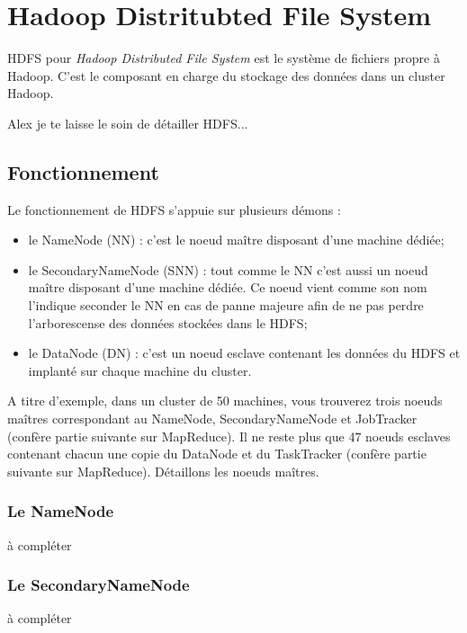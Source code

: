 \section{Hadoop Distritubted File System}

\par HDFS pour \textit{Hadoop Distributed File System} est le système de fichiers propre à Hadoop. C'est le composant en charge du stockage des données dans un cluster Hadoop.

\par Alex je te laisse le soin de détailler HDFS...

\subsection{Fonctionnement}

\par Le fonctionnement de HDFS s'appuie sur plusieurs démons :

\begin{itemize}
\item le NameNode (NN) : c'est le noeud maître disposant d'une machine dédiée;
\item le SecondaryNameNode (SNN) : tout comme le NN c'est aussi un noeud maître disposant d'une machine dédiée. Ce noeud vient comme son nom l'indique seconder le NN en cas de panne majeure afin de ne pas perdre l'arborescense des données stockées dans le HDFS;
\item le DataNode (DN) : c'est un noeud esclave contenant les données du HDFS et implanté sur chaque machine du cluster.
\end{itemize}

\par A titre d'exemple, dans un cluster de 50 machines, vous trouverez trois noeuds maîtres correspondant au NameNode, SecondaryNameNode et JobTracker (confère partie suivante sur MapReduce). Il ne reste plus que 47 noeuds esclaves contenant chacun une copie du DataNode et du TaskTracker (confère partie suivante sur MapReduce). Détaillons les noeuds maîtres.

\subsubsection{Le NameNode}

\par à compléter

\subsubsection{Le SecondaryNameNode}

\par à compléter

